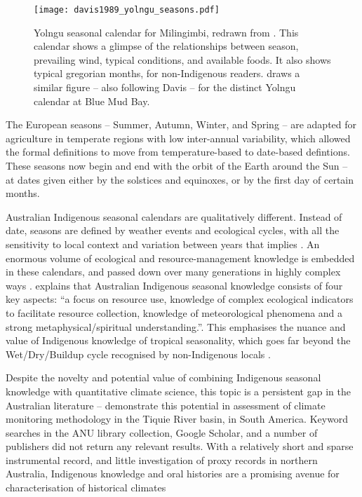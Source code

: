 \begin{SCfigure}[][bth]
    \centering
    \texttt{[image: davis1989\_yolngu\_seasons.pdf]}
    \caption[Yolngu seasonal calendar for Milingimbi \citep{davis1989}]{
        Yolngu seasonal calendar for Milingimbi, redrawn from \citet[p2]{davis1989}.
        This calendar shows a glimpse of the relationships between season,
        prevailing wind, typical conditions, and available foods.
        It also shows typical gregorian months, for non-Indigenous readers.
        \citet[][p.107]{barber2005} draws a similar figure -- also following
        Davis -- for the distinct Yolngu calendar at Blue Mud Bay.
        }
    \label{fig:yolngu-seasons}
\end{SCfigure}


The European seasons -- Summer, Autumn, Winter, and Spring -- are adapted for
agriculture in temperate regions with low inter-annual variability, which
allowed the formal definitions to move from temperature-based to date-based
defintions.  These seasons now begin and end with the orbit of the Earth
around the Sun -- at dates given either by the solstices and equinoxes, or
by the first day of certain months.


Australian Indigenous seasonal calendars are qualitatively different.
Instead of date, seasons are defined by weather events and ecological cycles,
with all the sensitivity to local context and variation between years that
implies \citep[eg.][]{davis1989}.  An enormous volume of ecological and
resource-management knowledge is embedded in these calendars, and passed
down over many generations in highly complex ways \citep{barber2005}.
%
\citet{woodward2012b} explains that Australian Indigenous seasonal knowledge
consists of four key aspects: ``a focus on resource use, knowledge of complex
ecological indicators to facilitate resource collection, knowledge of
meteorological phenomena and a strong metaphysical/spiritual understanding.''.
This emphasises the nuance and value of Indigenous knowledge of tropical
seasonality, which goes far beyond the Wet/Dry/Buildup cycle recognised
by non-Indigenous locals \citep{kingsley2003}.


Despite the novelty and potential value of combining Indigenous seasonal
knowledge with quantitative climate science, this topic is a persistent gap
in the Australian literature -- \citet{cochran2015} demonstrate this potential
in assessment of climate monitoring methodology in the Tiquie River basin,
in South America.  Keyword searches in the ANU library collection, Google
Scholar, and a number of publishers did not return any relevant results.
With a relatively short and sparse instrumental record, and little investigation
of proxy records in northern Australia, Indigenous knowledge and oral histories
are a promising avenue for characterisation of historical climates


